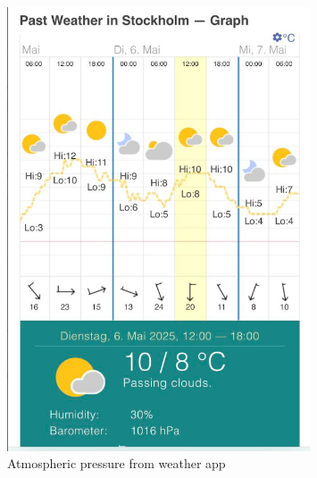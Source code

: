 \documentclass[12pt,a4paper]{article}
\begin{document}
\begin{figure}[H]
\centering
\includegraphics[width=0.8\textwidth]{weather appendix.png}
\caption{Atmospheric pressure from weather app}
\label{fig:weather_appendix}
\end{figure}
\end{document}
